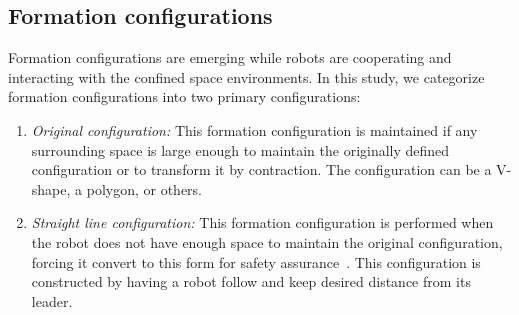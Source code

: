 \subsection{Formation configurations}\label{sec:config}
Formation configurations are emerging while robots are cooperating and interacting with the confined space environments. In this study, we categorize formation configurations into two primary configurations:
\begin{enumerate}
    \item \textit{Original configuration:} This formation configuration is maintained if any surrounding space is large enough to maintain the originally defined configuration or to transform it by contraction. The configuration can be a V-shape, a polygon, or others.
        \item \textit{Straight line configuration:} This formation configuration is performed when the robot does not have enough space to maintain the original configuration, forcing it convert to this form for safety assurance~\cite{Fu2020}. This configuration is constructed by having a robot follow and keep desired distance from its leader.
\end{enumerate}